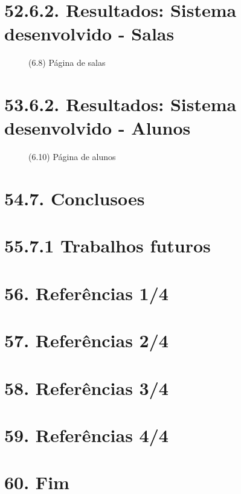 \chapter*{52.6.2. Resultados: Sistema desenvolvido - Salas}
\begin{figure}[htpb]\caption{(6.8) Página de salas}\end{figure}
\chapter*{53.6.2. Resultados: Sistema desenvolvido - Alunos}
\begin{figure}[htpb]\caption{(6.10) Página de alunos}\end{figure}
\chapter{54.7. Conclusoes}
\chapter*{55.7.1 Trabalhos futuros}

\postextual{} %


% 

\chapter*{56. Referências 1/4}
\chapter*{57. Referências 2/4}
\chapter*{58. Referências 3/4}
\chapter*{59. Referências 4/4}
\chapter*{60. Fim}


